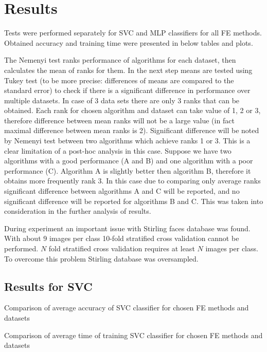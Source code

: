 \documentclass[a4paper, 10 pt, journal]{ieeeconf}
\begin{document}
\section{Results}

Tests were performed separately for SVC and MLP classifiers for all FE methods. Obtained accuracy and training time were presented in below tables and plots.

The Nemenyi test ranks performance of algorithms for each dataset, then calculates the mean of ranks for them. In the next step means are tested using Tukey test (to be more precise: differences of means are compared to the standard error) to check if there is a significant difference in performance over multiple datasets. In case of 3 data sets there are only 3 ranks that can be obtained. Each rank for chosen algorithm and dataset can take value of 1, 2 or 3, therefore difference between mean ranks will not be a large value (in fact maximal difference between mean ranks is 2). Significant difference will be noted by Nemenyi test between two algorithms which achieve ranks 1 or 3. This is a clear limitation of a post-hoc analysis in this case. Suppose we have two algorithms with a good performance (A and B) and one algorithm with a poor performance (C). Algorithm A is slightly better then algorithm B, therefore it obtains more frequently rank 3. In this case due to comparing only average ranks significant difference between algorithms A and C will be reported, and no significant difference will be reported for algorithms B and C. This was taken into consideration in the further analysis of results.

During experiment an important issue with Stirling faces database was found. With about 9 images per class 10-fold stratified cross validation cannot be performed. $N$ fold stratified cross validation requires at least $N$ images per class. To overcome this problem Stirling database was oversampled.

\subsection{Results for SVC}


\begin{table}[!h]
    \centering
    \caption{Comparison of average accuracy of SVC classifier for chosen FE methods and datasets}
    
    \label{table:svm_acc_comparison}
\end{table}

\begin{table}[!h]
    \centering
    \caption{Comparison of average time of training SVC classifier for chosen FE methods and datasets}
    
    \label{table:svm_fit_time_comparison}
\end{table}
\end{document}
